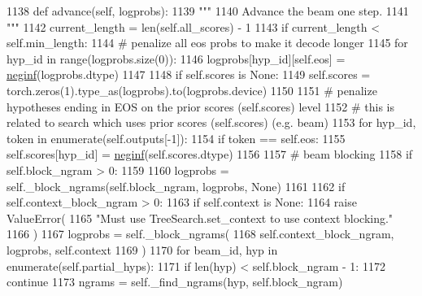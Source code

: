 \begin{DoxyCode}
1138     \textcolor{keyword}{def }advance(self, logprobs):
1139         \textcolor{stringliteral}{"""}
1140 \textcolor{stringliteral}{        Advance the beam one step.}
1141 \textcolor{stringliteral}{        """}
1142         current\_length = len(self.all\_scores) - 1
1143         \textcolor{keywordflow}{if} current\_length < self.min\_length:
1144             \textcolor{comment}{# penalize all eos probs to make it decode longer}
1145             \textcolor{keywordflow}{for} hyp\_id \textcolor{keywordflow}{in} range(logprobs.size(0)):
1146                 logprobs[hyp\_id][self.eos] = \hyperlink{namespaceparlai_1_1utils_1_1torch_a6c6e25115353dba479cd72dc31dc76ae}{neginf}(logprobs.dtype)
1147 
1148         \textcolor{keywordflow}{if} self.scores \textcolor{keywordflow}{is} \textcolor{keywordtype}{None}:
1149             self.scores = torch.zeros(1).type\_as(logprobs).to(logprobs.device)
1150 
1151         \textcolor{comment}{# penalize hypotheses ending in EOS on the prior scores (self.scores) level}
1152         \textcolor{comment}{# this is related to search which uses prior scores (self.scores) (e.g. beam)}
1153         \textcolor{keywordflow}{for} hyp\_id, token \textcolor{keywordflow}{in} enumerate(self.outputs[-1]):
1154             \textcolor{keywordflow}{if} token == self.eos:
1155                 self.scores[hyp\_id] = \hyperlink{namespaceparlai_1_1utils_1_1torch_a6c6e25115353dba479cd72dc31dc76ae}{neginf}(self.scores.dtype)
1156 
1157         \textcolor{comment}{# beam blocking}
1158         \textcolor{keywordflow}{if} self.block\_ngram > 0:
1159 
1160             logprobs = self.\_block\_ngrams(self.block\_ngram, logprobs, \textcolor{keywordtype}{None})
1161 
1162         \textcolor{keywordflow}{if} self.context\_block\_ngram > 0:
1163             \textcolor{keywordflow}{if} self.context \textcolor{keywordflow}{is} \textcolor{keywordtype}{None}:
1164                 \textcolor{keywordflow}{raise} ValueError(
1165                     \textcolor{stringliteral}{"Must use TreeSearch.set\_context to use context blocking."}
1166                 )
1167             logprobs = self.\_block\_ngrams(
1168                 self.context\_block\_ngram, logprobs, self.context
1169             )
1170             \textcolor{keywordflow}{for} beam\_id, hyp \textcolor{keywordflow}{in} enumerate(self.partial\_hyps):
1171                 \textcolor{keywordflow}{if} len(hyp) < self.block\_ngram - 1:
1172                     \textcolor{keywordflow}{continue}
1173                 ngrams = self.\_find\_ngrams(hyp, self.block\_ngram)

\end{DoxyCode}
